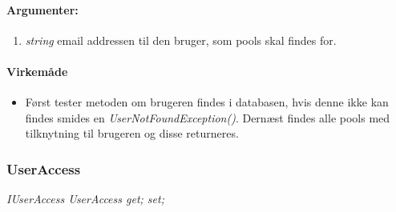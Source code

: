 \paragraph{Argumenter:}
\begin{enumerate}
	\item \textit{string} email addressen til den bruger, som pools skal findes for.
\end{enumerate}

\paragraph{Virkemåde}
\begin{itemize}
	\item Først tester metoden om brugeren findes i databasen, hvis denne ikke kan findes smides en \textit{UserNotFoundException()}. Dernæst findes alle pools med tilknytning til brugeren og disse returneres.
\end{itemize}






\subsubsection{UserAccess}%

\textit{IUserAccess UserAccess { get; set; }}